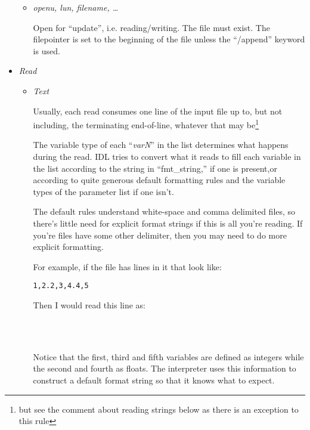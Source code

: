 \begin{itemize}
\begin{itemize}
      \item \textit{openu, lun, filename, \ldots}

        Open for ``update'', i.e. reading/writing. The file must
        exist. The filepointer is set to the beginning of the file
        unless the ``/append'' keyword is used.

    \end{itemize}


    \item \textit{Read}
      \begin{itemize}
	\item \textit{Text}


	   Usually, each read consumes one line of the input file up
	   to, but not including, the terminating end-of-line,
	   whatever that may be\footnote{but see the comment about
	   reading strings below as there is an exception to this
	   rule}

	   The variable type of each ``\textit{varN}'' in the list
	   determines what happens during the read. IDL tries to
	   convert what it reads to fill each variable in the list
	   according to the string in ``fmt\_string,'' if one is
	   present,or according to quite generous default formatting
	   rules and the variable types of the parameter list if one
	   isn't.

	   The default rules understand white-space and comma
	   delimited files, so there's little need for explicit format
	   strings if this is all you're reading. If you're files have
	   some other delimiter, then you may need to do more explicit
	   formatting.	

	   For example, if the file has lines in it that look like:

\begin{alltt}
1, 2.2, 3, 4.4, 5
\end{alltt}

           Then I would read this line as:

	   \\
	   \\

	   Notice that the first, third and fifth variables are
	   defined as integers while the second and fourth as
	   floats. The interpreter uses this information to construct
	   a default format string so that it knows what to expect.


\end{itemize}
\end{itemize}
